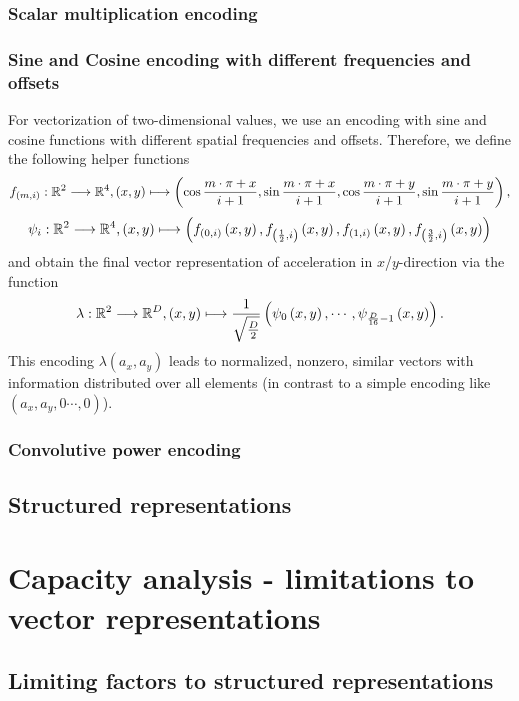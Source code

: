 \subsubsection{Scalar multiplication encoding}
\subsubsection{Sine and Cosine encoding with different frequencies and offsets}
For vectorization of two-dimensional values, we use an encoding with sine and cosine functions with different spatial frequencies and offsets.
Therefore, we define the following helper functions
\[ f_{\left(m,i\right)}: \mathbb{R}^2 \longrightarrow \mathbb{R}^4, \left(x,y\right) \longmapsto \left(\cos\frac{m\cdot \pi + x}{i + 1}, \sin\frac{m\cdot \pi + x}{i + 1}, \cos\frac{m\cdot \pi + y}{i + 1}, \sin\frac{m\cdot \pi + y}{i + 1}\right),
\]
\[
\psi_i: \mathbb{R}^2 \longrightarrow \mathbb{R}^4, \left(x,y\right) \longmapsto \left(f_{\left(0,i\right)}\left(x,y\right), f_{\left(\frac{1}{2},i\right)}\left(x,y\right), f_{\left(1,i\right)}\left(x,y\right), f_{\left(\frac{3}{2},i\right)}\left(x,y\right)\right)
\]
and obtain the final vector representation of acceleration in $x$/$y$-direction via the function
\[
\lambda: \mathbb{R}^2 \longrightarrow \mathbb{R}^D, \left(x,y\right) \longmapsto \frac{1}{\sqrt{\frac{D}{2}}}\left(\psi_0\left(x,y\right), \cdots, \psi_{\frac{D}{16}-1}\left(x,y\right)\right).
\]
This encoding $\lambda\left(a_x, a_y\right)$ leads to normalized, nonzero, similar vectors with information distributed over all elements (in contrast to a simple encoding like $\left(a_x, a_y, 0 \cdots, 0\right)$).
\subsubsection{Convolutive power encoding}

\subsection{Structured representations}%
\label{subsec:structured_representations}

\section{Capacity analysis - limitations to vector representations}%
\label{sec:capacity_analysis_limitations_to_vector_representations}

\subsection{Limiting factors to structured representations}%
\label{subsec:limiting_factors_to_structured_representations}


